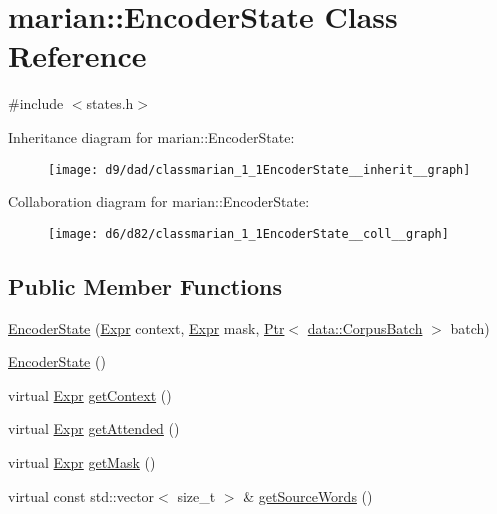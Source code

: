 \hypertarget{classmarian_1_1EncoderState}{}\section{marian\+:\+:Encoder\+State Class Reference}
\label{classmarian_1_1EncoderState}


{\ttfamily \#include $<$states.\+h$>$}



Inheritance diagram for marian\+:\+:Encoder\+State\+:
\nopagebreak
\begin{figure}[H]
\begin{center}
\leavevmode
\texttt{[image: d9/dad/classmarian\_1\_1EncoderState\_\_inherit\_\_graph]}
\end{center}
\end{figure}


Collaboration diagram for marian\+:\+:Encoder\+State\+:
\nopagebreak
\begin{figure}[H]
\begin{center}
\leavevmode
\texttt{[image: d6/d82/classmarian\_1\_1EncoderState\_\_coll\_\_graph]}
\end{center}
\end{figure}
\subsection*{Public Member Functions}
\begin{DoxyCompactItemize}
\item 
\hyperlink{classmarian_1_1EncoderState_ac0886e5123196f081f05b4b56ec2c609}{Encoder\+State} (\hyperlink{namespacemarian_a498d8baf75b754011078b890b39c8e12}{Expr} context, \hyperlink{namespacemarian_a498d8baf75b754011078b890b39c8e12}{Expr} mask, \hyperlink{namespacemarian_ad1a373be43a00ef9ce35666145137b08}{Ptr}$<$ \hyperlink{classmarian_1_1data_1_1CorpusBatch}{data\+::\+Corpus\+Batch} $>$ batch)
\item 
\hyperlink{classmarian_1_1EncoderState_a2ec499c3eb57a47ad2f951e5ea4621b9}{Encoder\+State} ()
\item 
virtual \hyperlink{namespacemarian_a498d8baf75b754011078b890b39c8e12}{Expr} \hyperlink{classmarian_1_1EncoderState_a35888943fb53059c7b524b3b011d7a0c}{get\+Context} ()
\item 
virtual \hyperlink{namespacemarian_a498d8baf75b754011078b890b39c8e12}{Expr} \hyperlink{classmarian_1_1EncoderState_a00f8d237ecedfae174695526969e590a}{get\+Attended} ()
\item 
virtual \hyperlink{namespacemarian_a498d8baf75b754011078b890b39c8e12}{Expr} \hyperlink{classmarian_1_1EncoderState_a5ae25950692389c47b4035ebcae4725e}{get\+Mask} ()
\item 
virtual const std\+::vector$<$ size\+\_\+t $>$ \& \hyperlink{classmarian_1_1EncoderState_a21e65549359c321ee7874e56ca04405b}{get\+Source\+Words} ()
\end{DoxyCompactItemize}
